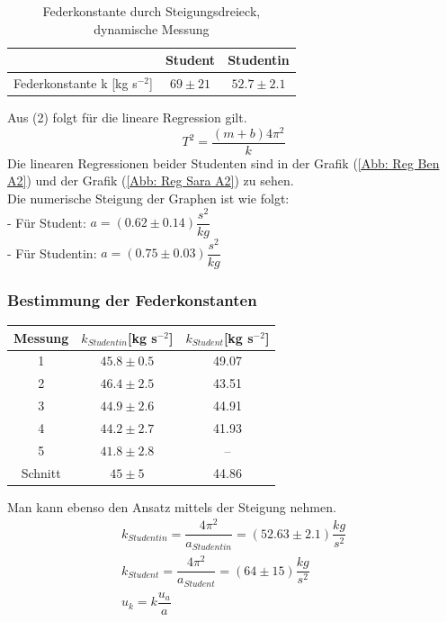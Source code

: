 \documentclass[bibliography=totocnumbered]{scrartcl}
\begin{document}
	\begin{table}
		\centering
		\caption{Federkonstante durch Steigungsdreieck, \\ dynamische Messung}
		\begin{tabular}{|c|c|c|}
			\hline
			& Student & Studentin \\
			\hline
			Federkonstante k [kg s$ ^{-2} $]& $ 69\pm21 $ &$ 52.7\pm2.1 $  \\
			\hline
		\end{tabular}
		\label{tab: Federkonstante, Steigungsdreieck, dyn. Messung}
	\end{table}

	Aus (2) folgt für die lineare Regression gilt.
	\begin{equation}
		T^{2}=\dfrac{(m+b)4\pi^{2}}{k}
	\end{equation}
Die linearen Regressionen beider Studenten sind in der Grafik (\ref{Abb: Reg Ben A2}) und der Grafik (\ref{Abb: Reg Sara A2}) zu sehen.\\
Die numerische Steigung der Graphen ist wie folgt:\\
- Für Student: $a= (0.62\pm 0.14)\dfrac{s^{2}}{kg} $\\
- Für Studentin: $a= (0.75\pm 0.03)\dfrac{s^{2}}{kg} $
\subsubsection{Bestimmung der Federkonstanten}
\begin{table}[ht!]
	\centering
	\begin{tabular}{|c|c|c|}
		\hline
		Messung & $ k_{Studentin} $[kg s$ ^{-2} $] &   $ k_{Student} $[kg s$ ^{-2} $]\\
		\hline
		1 & $ 45.8\pm 0.5$ & 49.07 \\
		\hline
		2 & $ 46.4\pm 2.5$ & 43.51 \\
		\hline
		3 & $ 44.9\pm2.6 $ & 44.91 \\
		\hline
		4 & $ 44.2\pm2.7 $ & 41.93 \\
		\hline
		5 & $ 41.8\pm 2.8$ & -- \\
		\hline
			Schnitt & $ 45\pm 5$ & 44.86\\
		\hline
	\end{tabular}
\end{table}
Man kann ebenso den Ansatz mittels der Steigung nehmen.
\begin{align}
	k_{Studentin}=\dfrac{4\pi ^{2}}{a_{Studentin}}=(52.63\pm 2.1)\dfrac{kg}{s^{2}}\\
	k_{Student}=\dfrac{4\pi ^{2}}{a_{Student}}=(64\pm15)\dfrac{kg}{s^{2}}\\
	u_{k}=k\dfrac{u_{a}}{a}
\end{align}
\end{document}
